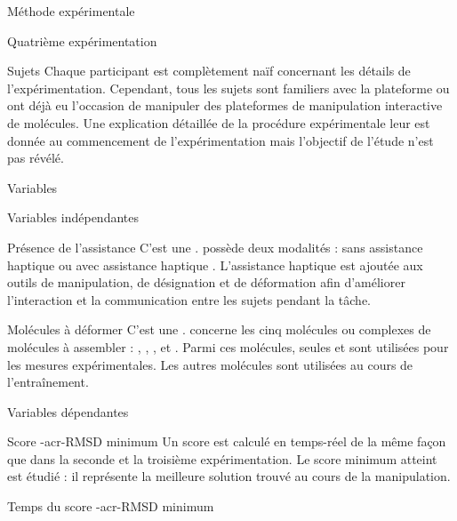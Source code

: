 \documentclass[myfrancais,ngerman,english,french]{mythesis}
\begin{document}
\begin{mychapter}{Méthode expérimentale}
\begin{mysection}{Quatrième expérimentation}
\begin{mysubsection}{Sujets}
				Chaque participant est complètement naïf concernant les détails de l'expérimentation.
				Cependant, tous les sujets sont familiers avec la plateforme \myShaddock ou ont déjà eu l'occasion de manipuler des plateformes de manipulation interactive de molécules.
				Une explication détaillée de la procédure expérimentale leur est donnée au commencement de l'expérimentation mais l'objectif de l'étude n'est pas révélé.
			\end{mysubsection}
			\begin{mysubsection}{Variables}
				\begin{mysubsubsection}{Variables indépendantes}
					\begin{myparagraph}{ Présence de l'assistance}
						C'est une .
						 possède deux modalités : \og sans assistance haptique \fg ou \og avec assistance haptique \fg.
						L'assistance haptique est ajoutée aux outils de manipulation, de désignation et de déformation afin d'améliorer l'interaction et la communication entre les sujets pendant la tâche.
					\end{myparagraph}
					\begin{myparagraph}{ Molécules à déformer}
						C'est une \myglos{glo-VariableIntraSujets}.
						 concerne les cinq molécules ou complexes de molécules à assembler : \og \myTRPCAGE \fg, \og \myPrion \fg, \og \myUbiquitin \fg, \og \myTRPZIPPER \fg et \og \myNusENusG \fg.
						Parmi ces molécules, seules \myUbiquitin et \myNusENusG sont utilisées pour les mesures expérimentales.
						Les autres molécules sont  utilisées au cours de l'entraînement.
					\end{myparagraph}
				\end{mysubsubsection}
				\begin{mysubsubsection}{Variables dépendantes}
					\begin{myparagraph}{ Score \myacronl-{acr-RMSD} minimum}
						Un score  est calculé en temps-réel de la même façon que dans la seconde et la troisième expérimentation.
						Le score minimum atteint est étudié : il représente la meilleure solution trouvé au cours de la manipulation.
					\end{myparagraph}
					\begin{myparagraph}{ Temps du score \myacronl-{acr-RMSD} minimum}

\end{myparagraph}
\end{mysubsubsection}
\end{mysubsection}
\end{mysection}
\end{mychapter}
\end{document}
